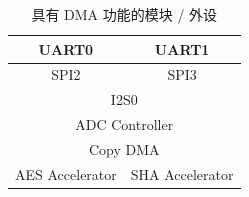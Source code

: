 
\begin{table}[H]
    \centering
    \caption{具有 DMA 功能的模块 / 外设}
    \label{table:Module_with_DMA}
 \begin{tabular}{|*{6}{c|}}

    \hline
    \multicolumn{3}{|c|}{UART0} & \multicolumn{3}{c|}{UART1}   \\
    \hline
    \hline
    \multicolumn{3}{|c|}{SPI2} & \multicolumn{3}{c|}{SPI3} \\
    \hline
    \hline
    \multicolumn{6}{|c|}{I2S0}  \\
    \hline
    \hline
    \multicolumn{6}{|c|}{ADC Controller} \\
    \hline
    \hline
    \multicolumn{6}{|c|}{Copy DMA} \\
    \hline
    \hline
    \multicolumn{3}{|c|}{AES Accelerator} & \multicolumn{3}{c|}{SHA Accelerator} \\
    \hline
\end{tabular}
\end{table}
